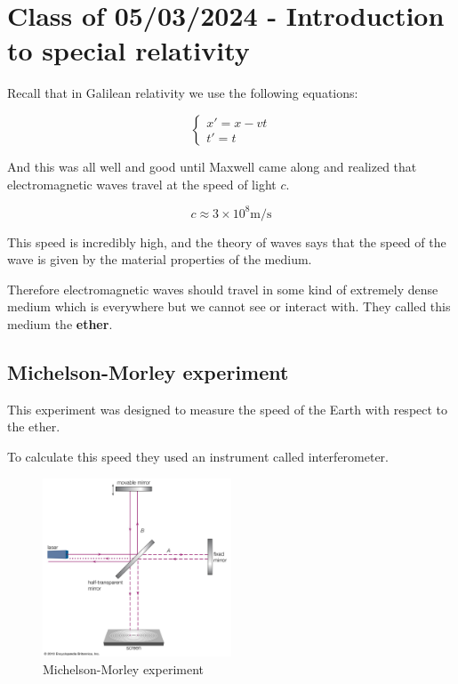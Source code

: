 \documentclass[10pt]{extarticle}
\begin{document}
\section{Class of 05/03/2024 - Introduction to special relativity}

Recall that in Galilean relativity we use the following equations:

$$
    \begin{cases}
        x' = x - vt \\
        t' = t
    \end{cases}
$$

And this was all well and good until Maxwell came along and realized that electromagnetic waves travel at the speed of light $c$.

$$
    c \approx 3 \times 10^8 \si{\meter \per \second}
$$

This speed is incredibly high, and the theory of waves says that the speed of the wave is given by the material properties of the medium.

Therefore electromagnetic waves should travel in some kind of extremely dense medium which is everywhere but we cannot see or interact with.
They called this medium the \textbf{ether}.

\subsection{Michelson-Morley experiment}

This experiment was designed to measure the speed of the Earth with respect to the ether.

To calculate this speed they used an instrument called interferometer.

\begin{figure}[H]
    \centering
    \includegraphics[width=0.5\textwidth]{assets/physics/michelson-morley-experiment.jpg}

    \caption{Michelson-Morley experiment}
    \label{fig:michelson-morley-experiment}
\end{figure}
\end{document}
